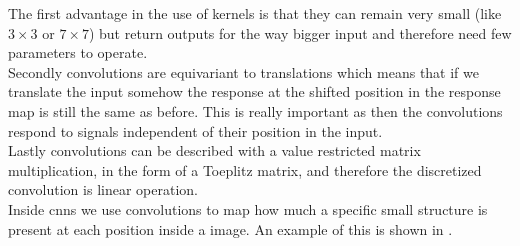 The first advantage in the use of kernels is that they can remain very small (like $3\times 3$ or $7\times 7$) but return outputs for the way bigger input and therefore need few parameters to operate.\\
Secondly convolutions are equivariant to translations which means that if we translate the input somehow the response at the shifted position in the response map is still the same as before. This is really important as then the convolutions respond to signals independent of their position in the input.\\
Lastly convolutions can be described with a value restricted matrix multiplication, in the form of a Toeplitz matrix, and therefore the discretized convolution is linear operation.\\
Inside \glspl{cnn} we use convolutions to map how much a specific small structure is present at each position inside a image. An example of this is shown in .

